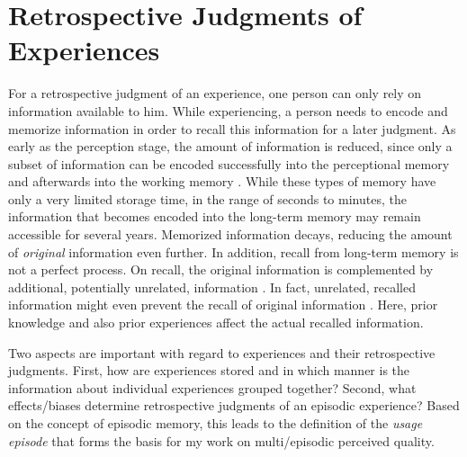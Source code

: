 \section{Retrospective Judgments of Experiences}\label{chap:03}
For a retrospective judgment of an experience, one person can only rely on information available to him.
While experiencing, a person needs to encode and memorize information in order to recall this information for a later judgment.
As early as the perception stage, the amount of information is reduced, since only a subset of information can be encoded successfully into the perceptional memory and afterwards into the working memory \citep[][p.\,8f.]{raake_speech_2006}.
While these types of memory have only a very limited storage time, in the range of seconds to minutes, the information that becomes encoded into the long-term memory may remain accessible for several years.
Memorized information decays, reducing the amount of \emph{original} information even further.
In addition, recall from long-term memory is not a perfect process.
On recall, the original information is complemented by additional, potentially unrelated, information \citep[\cf{}][]{schacter_seven_2003}.
In fact, unrelated, recalled information might even prevent the recall of original information \citep[\cf{}][]{schacter_seven_2003}.
Here, prior knowledge and also prior experiences affect the actual recalled information.

Two aspects are important with regard to experiences and their retrospective judgments.
First, how are experiences stored and in which manner is the information about individual experiences grouped together?
Second, what effects/biases determine retrospective judgments of an episodic experience?
Based on the concept of episodic memory, this leads to the definition of the \emph{usage episode} that forms the basis for my work on multi\-/episodic perceived quality.

